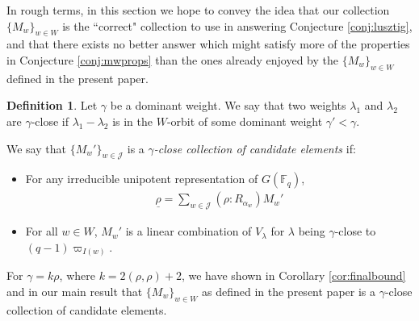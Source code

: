 \documentclass{amsart}
\theoremstyle{definition}
\newtheorem{defn}[thm]{Definition}
\begin{document}
In rough terms, in this section we hope to convey the idea that our collection $\{M_w\}_{w \in W}$ is the ``correct" collection to use in answering Conjecture \ref{conj:lusztig}, and that there exists no better answer which might satisfy more of the properties in Conjecture \ref{conj:mwprops} than the ones already enjoyed by the $\{M_w\}_{w \in W}$ defined in the present paper.

\begin{defn}\label{def:candidate}
    Let $\gamma$ be a dominant weight. We say that two weights $\lambda_1$ and $\lambda_2$ are $\gamma$-close if $\lambda_1 - \lambda_2$ is in the $W$-orbit of some dominant weight $\gamma' < \gamma$. 
    
    We say that $\{M_w'\}_{w \in \mathcal{J}}$ is a \emph{$\gamma$-close collection of candidate elements} if:
    \begin{itemize}
        \item For any irreducible unipotent representation of $G(\mathbb{F}_q)$,
        \begin{align}
            \underline{\rho} = \sum_{w \in \mathcal{J}} (\rho : R_{\alpha_w}) M_w'
        \end{align}
        \item For all $w \in W$, $M_w'$ is a linear combination of $V_{\lambda}$ for $\lambda$ being $\gamma$-close to $(q-1)\varpi_{I(w)}$.
    \end{itemize}
\end{defn}

For $\gamma = k\rho$, where $k = 2(\rho, \rho) + 2$, we have shown in Corollary \ref{cor:finalbound} and in our main result that $\{M_w\}_{w \in W}$ as defined in the present paper is a $\gamma$-close collection of candidate elements.
\end{document}
